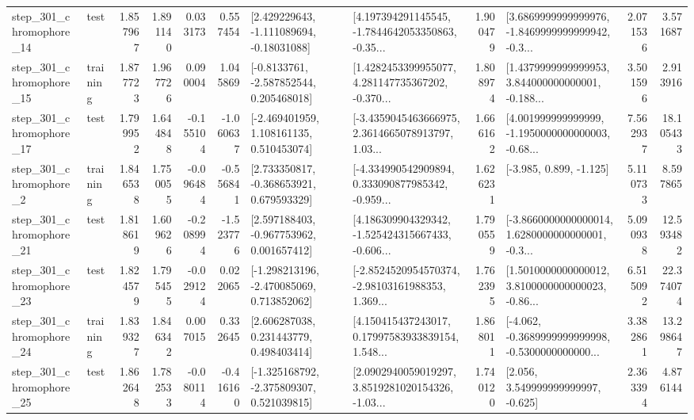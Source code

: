 \begin{tabular}{llrrrrllrlrr}
  step\_301\_chromophore\_14 &      test &      1.857967 &    1.891140 &      0.033173 &  0.557454 &    [2.429229643, -1.111089694, -0.18031088] &  [4.197394291145545, -1.7844642053350863, -0.35... &       1.900479 &  [3.6869999999999976, -1.8469999999999942, -0.3... &            2.071536 &          3.571687 \\
  step\_301\_chromophore\_15 &  training &      1.877723 &    1.967726 &      0.090004 &  1.045869 &     [-0.8133761, -2.587852544, 0.205468018] &  [1.4282453399955077, 4.281147735367202, -0.370... &       1.808974 &  [1.4379999999999953, 3.844000000000001, -0.188... &            3.501596 &          2.913916 \\
  step\_301\_chromophore\_17 &      test &      1.799952 &    1.644848 &     -0.155104 & -1.060637 &    [-2.469401959, 1.108161135, 0.510453074] &  [-3.4359045463666975, 2.3614665078913797, 1.03... &       1.666162 &  [4.001999999999999, -1.1950000000000003, -0.68... &            7.562937 &         18.105433 \\
   step\_301\_chromophore\_2 &  training &      1.846538 &    1.750055 &     -0.096484 & -0.556841 &    [2.733350817, -0.368653921, 0.679593329] &  [-4.334990542909894, 0.333090877985342, -0.959... &       1.626231 &                            [-3.985, 0.899, -1.125] &            5.110733 &          8.597865 \\
  step\_301\_chromophore\_21 &      test &      1.818619 &    1.609626 &     -0.208994 & -1.523776 &    [2.597188403, -0.967753962, 0.001657412] &  [4.186309904329342, -1.525424315667433, -0.606... &       1.790559 &  [-3.8660000000000014, 1.6280000000000001, -0.3... &            5.090938 &         12.593482 \\
  step\_301\_chromophore\_23 &      test &      1.824579 &    1.795455 &     -0.029124 &  0.022065 &   [-1.298213196, -2.470085069, 0.713852062] &  [-2.8524520954570374, -2.98103161988353, 1.369... &       1.762395 &  [1.5010000000000012, 3.8100000000000023, -0.86... &            6.515092 &         22.374074 \\
  step\_301\_chromophore\_24 &  training &      1.839327 &    1.846342 &      0.007015 &  0.332645 &     [2.606287038, 0.231443779, 0.498403414] &  [4.150415437243017, 0.17997583933839154, 1.548... &       1.868011 &  [-4.062, -0.3689999999999998, -0.5300000000000... &            3.382861 &         13.298647 \\
  step\_301\_chromophore\_25 &      test &      1.862648 &    1.782533 &     -0.080114 & -0.416160 &   [-1.325168792, -2.375809307, 0.521039815] &  [2.0902940059019297, 3.8519281020154326, -1.03... &       1.740120 &                 [2.056, 3.549999999999997, -0.625] &            2.363394 &          4.876144 \\

\end{tabular}
